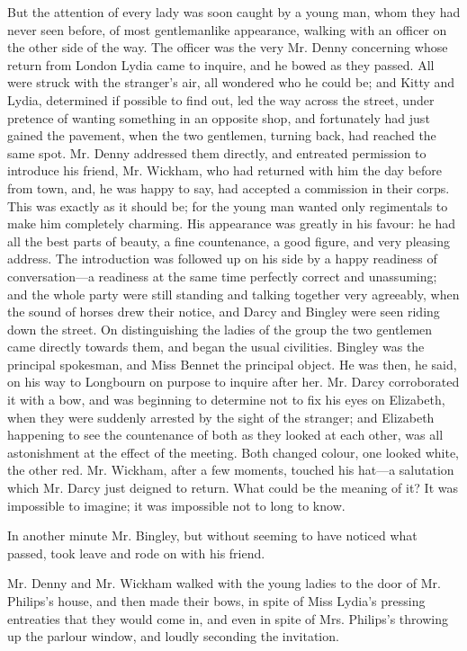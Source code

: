 But the attention of every lady was soon caught by a young man, whom they had never seen before, of most gentlemanlike appearance, walking with an officer on the other side of the way. The officer was the very Mr. Denny concerning whose return from London Lydia came to inquire, and he bowed as they passed. All were struck with the stranger's air, all wondered who he could be; and Kitty and Lydia, determined if possible to find out, led the way across the street, under pretence of wanting something in an opposite shop, and fortunately had just gained the pavement, when the two gentlemen, turning back, had reached the same spot. Mr. Denny addressed them directly, and entreated permission to introduce his friend, Mr. Wickham, who had returned with him the day before from town, and, he was happy to say, had accepted a commission in their corps. This was exactly as it should be; for the young man wanted only regimentals to make him completely charming. His appearance was greatly in his favour: he had all the best parts of beauty, a fine countenance, a good figure, and very pleasing address. The introduction was followed up on his side by a happy readiness of conversation---a readiness at the same time perfectly correct and unassuming; and the whole party were still standing and talking together very agreeably, when the sound of horses drew their notice, and Darcy and Bingley were seen riding down the street. On distinguishing the ladies of the group the two gentlemen came directly towards them, and began the usual civilities. Bingley was the principal spokesman, and Miss Bennet the principal object. He was then, he said, on his way to Longbourn on purpose to inquire after her. Mr. Darcy corroborated it with a bow, and was beginning to determine not to fix his eyes on Elizabeth, when they were suddenly arrested by the sight of the stranger; and Elizabeth happening to see the countenance of both as they looked at each other, was all astonishment at the effect of the meeting. Both changed colour, one looked white, the other red. Mr. Wickham, after a few moments, touched his hat---a salutation which Mr. Darcy just deigned to return. What could be the meaning of it? It was impossible to imagine; it was impossible not to long to know.

In another minute Mr. Bingley, but without seeming to have noticed what passed, took leave and rode on with his friend.

Mr. Denny and Mr. Wickham walked with the young ladies to the door of Mr. Philips's house, and then made their bows, in spite of Miss Lydia's pressing entreaties that they would come in, and even in spite of Mrs. Philips's throwing up the parlour window, and loudly seconding the invitation.

